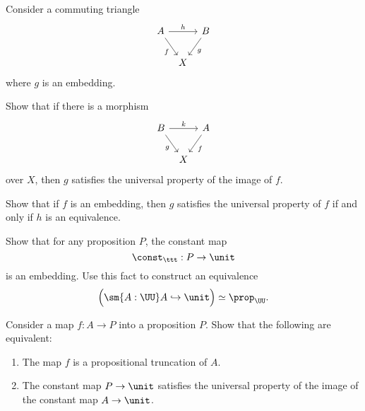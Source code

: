 \begin{exercises}
  \exitem Consider a commuting triangle
  \begin{equation*}
    \begin{tikzcd}[column sep=tiny]
      A \arrow[dr,swap,"f"] \arrow[rr,"h"] & & B \arrow[dl,"g"] \\
      & X
    \end{tikzcd}
  \end{equation*}
  where $g$ is an embedding.
  \begin{subexenum}
  \item Show that if there is a morphism
    \begin{equation*}
      \begin{tikzcd}[column sep=tiny]
        B \arrow[dr,swap,"g"] \arrow[rr,"k"] & & A \arrow[dl,"f"] \\
        & X
      \end{tikzcd}
    \end{equation*}
    over $X$, then $g$ satisfies the universal property of the image of $f$.
  \item Show that if $f$ is an embedding, then $g$ satisfies the universal property of $f$ if and only if $h$ is an equivalence.
  \end{subexenum}
  \exitem
  \begin{subexenum}
  \item Show that for any proposition $P$, the constant map
    \begin{equation*}
      \const_\ttt : P \to \unit
    \end{equation*}
    is an embedding. Use this fact to construct an equivalence
    \begin{equation*}
      \Big(\sm{A:\UU}A\hookrightarrow\unit\Big)\simeq\prop_\UU.
    \end{equation*}
  \item Consider a map $f:A\to P$ into a proposition $P$. Show that the following are equivalent:
    \begin{enumerate}
    \item The map $f$ is a propositional truncation of $A$.
    \item The constant map $P\to\unit$ satisfies the universal property of the image of the constant map $A\to\unit$.
    \end{enumerate}
  \end{subexenum}

\end{exercises}
